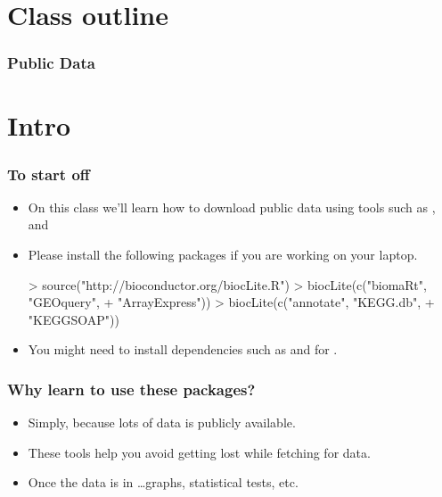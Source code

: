 




\usepackage{Sweave}


\begin{frame}[allowframebreaks]
  \titlepage
\end{frame}

\section*{Class outline}

\begin{frame}[allowframebreaks]
  \frametitle{Public Data}
  \tableofcontents[hideallsubsections]
\end{frame}

\section{Intro}

\begin{frame}
  \frametitle{To start off}
  \begin{itemize}
  \item On this class we'll learn how to download public data using tools such as ,  and 
  \item Please \alert{install} the following packages if you are working on your laptop.
\begin{Schunk}
\begin{Sinput}
> source("http://bioconductor.org/biocLite.R")
> biocLite(c("biomaRt", "GEOquery", 
+     "ArrayExpress"))
> biocLite(c("annotate", "KEGG.db", 
+     "KEGGSOAP"))
\end{Sinput}
\end{Schunk}
  \item You might need to install dependencies such as  and  for .
  \end{itemize}
\end{frame}

\begin{frame}[allowframebreaks]
  \frametitle{Why learn to use these packages?}
  \begin{itemize}
  \item Simply, because lots of data is publicly available.
  \item These tools help you avoid getting lost while fetching for data.
  \item Once the data is in \ldots graphs, statistical tests, etc.
  \end{itemize}
\end{frame}

